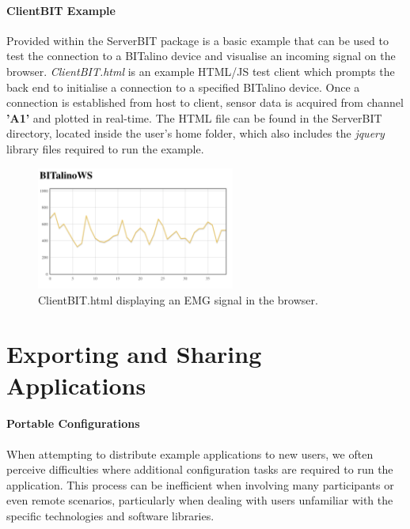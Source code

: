 \paragraph{ClientBIT Example}
Provided within the ServerBIT package is a basic example that can be used to test the connection to a BITalino device and visualise an incoming signal on the browser. \textit{ClientBIT.html} is an example HTML/JS
test client which prompts the back end to initialise a connection to a specified BITalino device. Once a connection is established from host to client, sensor data is acquired from channel \textbf{'A1'} and plotted in real-time. The HTML file can be found in the ServerBIT directory, located inside the user's home folder, which also includes the \textit{jquery} library files required to run the example.

\begin{figure}[htb!]
    \centering
    \includegraphics[width=65mm,scale=0.65]{Chapters/Figures/technical/ServerBIT/ClientBIT_html.png}
    \caption{ClientBIT.html displaying an EMG signal in the browser.}
    \label{fig:ClientBIT}
\end{figure}

\section{Exporting and Sharing Applications}

\paragraph{Portable Configurations}

When attempting to distribute example applications to new users, we often perceive difficulties where additional configuration tasks are required to run the application. This process can be inefficient when involving many participants or even remote scenarios, particularly when dealing with users unfamiliar with the specific technologies and software libraries.

